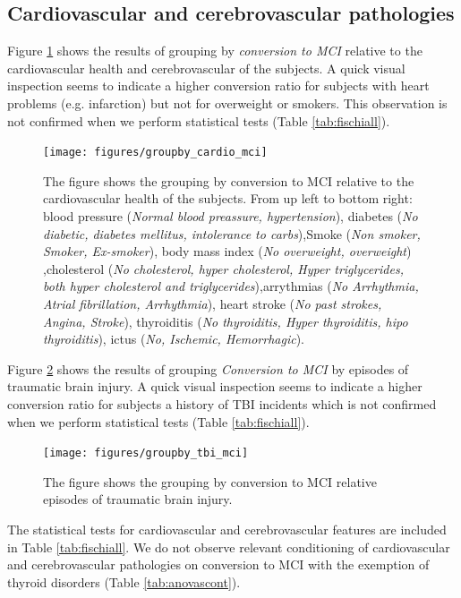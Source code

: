 \documentclass[11pt]{article}
\theoremstyle{definition}
\theoremstyle{remark}
\begin{document}
\subsection{Cardiovascular and cerebrovascular pathologies}
Figure \ref{fig:groupby_cardio_mci} shows the results of grouping by \emph{conversion to MCI} relative to the cardiovascular health and cerebrovascular of the subjects. A quick visual inspection seems to indicate a higher conversion ratio for subjects with heart problems (e.g. infarction) but not for overweight or smokers.
This observation is not confirmed when we perform statistical tests (Table \ref{tab:fischiall}).
\begin{figure}[H]
        \centering
        \texttt{[image: figures/groupby\_cardio\_mci]}
        \caption{The figure shows the grouping by conversion to MCI relative to the cardiovascular health of the subjects. From up left to bottom right: blood pressure (\emph{Normal blood preassure, hypertension}), diabetes (\emph{No diabetic, diabetes mellitus, intolerance to carbs}),Smoke (\emph{Non smoker, Smoker, Ex-smoker}), body mass index (\emph{No overweight, overweight}) ,cholesterol (\emph{No cholesterol, hyper cholesterol, Hyper triglycerides, both hyper cholesterol and triglycerides}),arrythmias (\emph{No Arrhythmia, Atrial fibrillation, Arrhythmia}), heart stroke (\emph{No past strokes, Angina, Stroke}), thyroiditis (\emph{No thyroiditis, Hyper thyroiditis, hipo thyroiditis}), ictus (\emph{No, Ischemic, Hemorrhagic}).}
        \label{fig:groupby_cardio_mci}
\end{figure}

Figure \ref{fig:groupby_tbi_mci} shows the results of grouping \emph{Conversion to MCI} by episodes of traumatic brain injury. A quick visual inspection seems to indicate a higher conversion ratio for subjects a history of TBI incidents which is not confirmed when we perform statistical tests (Table \ref{tab:fischiall}).

\begin{figure}[H]
        \centering
        \texttt{[image: figures/groupby\_tbi\_mci]}
        \caption{The figure shows the grouping by conversion to MCI relative episodes of traumatic brain injury.}
        \label{fig:groupby_tbi_mci}
\end{figure}

The statistical tests for cardiovascular and cerebrovascular features are included in Table \ref{tab:fischiall}. We do not observe relevant conditioning of cardiovascular and cerebrovascular pathologies on conversion to MCI with the exemption of thyroid disorders (Table \ref{tab:anovascont}).
\end{document}
